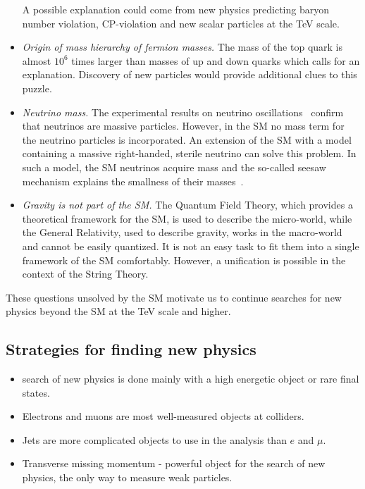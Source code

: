 \begin{itemize}
A possible explanation could come from new physics predicting baryon number violation, CP-violation and new scalar particles at the TeV scale.
\item \textit{Origin of mass hierarchy of fermion masses.} The mass of the top quark is almost $10^6$ times larger than masses of up and down quarks which calls for an explanation. Discovery of new particles would provide additional clues to this puzzle.
\item \textit{Neutrino mass.} The experimental results on neutrino oscillations~\cite{Fukuda:1998fd} confirm that neutrinos are massive particles. However, in the SM no mass term for the neutrino particles is incorporated. An extension of the SM with a model containing a massive right-handed, sterile neutrino can solve this problem. In such a model, the SM neutrinos acquire mass and the so-called seesaw mechanism explains the smallness of their masses~\cite{Mohapatra:1979ia}.
\item \textit{Gravity is not part of the SM.} The Quantum Field Theory, which provides a theoretical framework for the SM, is used to describe the micro-world, while the General Relativity, used to describe gravity, works in the macro-world and cannot be easily quantized. It is not an easy task to fit them into a single framework of the SM comfortably. However, a unification is possible in the context of the String Theory.
\end{itemize}

These questions unsolved by the SM motivate us to continue searches for new physics beyond the SM at the TeV scale and higher.

\subsection{Strategies for finding new physics}

\begin{itemize}
 \item search of new physics is done mainly with a high energetic object or rare final states.
 \item Electrons and muons are most well-measured objects at colliders.
 \item Jets are more complicated objects to use in the analysis than $e$ and $\mu$.
 \item Transverse missing momentum - powerful object for the search of new physics, the only way to measure weak particles.
\end{itemize}


